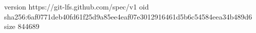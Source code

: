 version https://git-lfs.github.com/spec/v1
oid sha256:6af0771deb40fd61f25d9a85ee4eaf07e3012916461d5b6c54584eea34b489d6
size 844689
